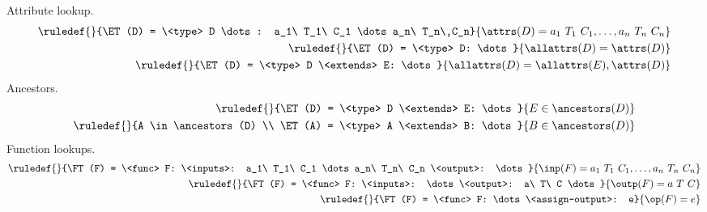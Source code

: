 Attribute lookup.
\begin{align*}
\ruledef{}{\ET(D) = \<type> D \dots: a_1\ T_1\ C_1 \dots a_n\ T_n\ C_n}{\attrs(D) = a_1\ T_1\ C_1, \dots , a_n\ T_n\ C_n}
\\
\ruledef{}{\ET(D) = \<type> D: \dots}{\allattrs(D) = \attrs(D)}
\\
\ruledef{}{\ET(D) = \<type> D \<extends> E: \dots}{\allattrs(D) = \allattrs(E), \attrs(D)}
\end{align*}
Ancestors.
\begin{align*}
\ruledef{}{\ET(D) = \<type> D \<extends> E: \dots}{E \in \ancestors(D)}
\\
\ruledef{}{A \in \ancestors(D) \\ \ET(A) = \<type> A \<extends> B: \dots}{B \in \ancestors(D)}
\end{align*}
Function lookups.
\begin{align*}
\ruledef{}{\FT(F) = \<func> F: \<inputs>: a_1\ T_1\ C_1 \dots a_n\ T_n\ C_n \<output>: \dots}{\inp(F) = a_1\ T_1\ C_1, \dots, a_n\ T_n\ C_n}
\\
\ruledef{}{\FT(F) = \<func> F: \<inputs>: \dots \<output>: a\ T\ C \dots}{\outp(F) = a\ T\ C}
\\
\ruledef{}{\FT(F) = \<func> F: \dots \<assign-output>: e}{\op(F) = e}
\end{align*}
